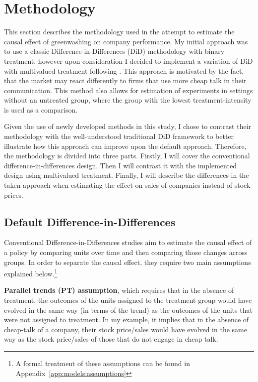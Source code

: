 \documentclass[12pt]{article}
\begin{document}
\section{Methodology}\label{sect:methodology}

This section describes the methodology used in the attempt to estimate the causal effect of greenwashing on company performance.
My initial approach was to use a classic Difference-in-Differences (DiD) methodology with binary treatment, however upon consideration I decided to implement a variation of DiD with multivalued treatment following \textcite{callawayDifferenceinDifferencesContinuousTreatment2025}. This approach is motivated by the fact, that the market may react differently to firms that use more cheap talk in their communication. This method also allows for estimation of experiments in settings without an untreated group, where the group with the lowest treatment-intensity is used as a comparison. 

Given the use of newly developed methods in this study, I chose to contrast their methodology with the well-understood traditional DiD framework to better illustrate how this approach can improve upon the default approach. Therefore, the methodology is divided into three parts. Firstly, I will cover the conventional difference-in-differences design. Then I will contrast it with the implemented design using multivalued treatment. Finally, I will describe the differences in the taken approach when estimating the effect on sales of companies instead of stock prices.


\subsection{Default Difference-in-Differences}

Conventional Difference-in-Differences studies aim to estimate the causal effect of a policy by comparing units over time and then comparing those changes across groups. In order to separate the causal effect, they require two main assumptions explained below.\footnote{A formal treatment of these assumptions can be found in Appendix~\ref{app:models:assumptions}} 

\textbf{Parallel trends (PT) assumption}, which requires that in the absence of treatment, the outcomes of the units assigned to the treatment group would have evolved in the same way (in terms of the trend) as the outcomes of the units that were not assigned to treatment. In my example, it implies that in the absence of cheap-talk of a company, their stock price/sales would have evolved in the same way as the stock price/sales of those that do not engage in cheap talk. 
\end{document}
